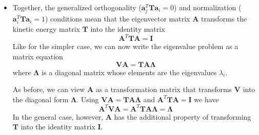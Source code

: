 \documentclass[11pt, a4paper]{article}
\newcommand{\mat}[1]{\mathbf{#1}} %
\begin{document}
\begin{itemize}
	\item Together, the generalized orthogonality ($ \mat{a}_{j}^{T} \mat{T} \bm{a}_{i} = 0 $) and normalization ($ \bm{a}_{i}^{T} \mat{T} \bm{a}_{i} = 1 $) conditions mean that the eigenvector matrix $ \mat{A} $ transforms the kinetic energy matrix $ \mat{T} $ into the identity matrix
	\begin{equation*}
		\mat{A}^{T} \mat{T} \mat{A} = \mat{I}
	\end{equation*}
	Like for the simpler case, we can now write the eigenvalue problem as a matrix equation 
	\begin{equation*}
		\mat{V} \mat{A} = \mat{T} \mat{A} \mat{\Lambda}
	\end{equation*}
	where $ \mat{\Lambda} $ is a diagonal matrix whose elements are the eigenvalues $ \lambda_{i} $. 
	
	As before, we can view $ \mat{A} $ as a transformation matrix that transforms $ \mat{V} $ into the diagonal form $ \mat{\Lambda} $. Using $ \mat{V} \mat{A} = \mat{T} \mat{A} \mat{\Lambda} $ and $ \mat{A}^{T} \mat{T} \mat{A} = \mat{I} $ we have
	\begin{equation*}
		\mat{A}^{T} \mat{V} \mat{A} = \mat{A}^{T} \mat{T} \mat{A}\mat{\Lambda} = \mat{\Lambda}
	\end{equation*}
	In the general case, however, $ \mat{A} $ has the additional property of transforming $ \mat{T} $ into the identity matrix $ \mat{I} $.
	
\end{itemize}
\end{document}
